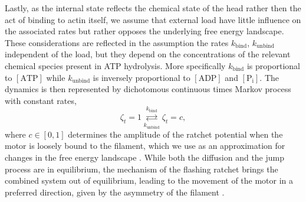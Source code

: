 \documentclass[aps,pre,twocolumn,showpacs,showkeys,superscriptaddress,floatfix]{revtex4-1}
\begin{document}
Lastly, as the internal state reflects the chemical state of the head rather then the act of binding to actin itself,
we assume that external load have little influence on the associated rates but rather opposes the underlying free energy landscape. 
These considerations are reflected in the assumption the rates $k_\text{bind}$, $k_\text{unbind}$ independent of the load, 
but they depend on the concentrations of the relevant chemical species present in ATP hydrolysis. 
More specifically $k_\text{bind}$ is proportional to $[\text{ATP}]$ while $k_\text{unbind}$ is inversely proportional to $[\text{ADP}]$ and $[\text{P}_\text{i}]$.
The dynamics is then represented by dichotomous continuous times Markov process with constant rates,
\begin{equation}
\zeta_t = 1 \overset{k_\text{bind}}{\underset{k_\text{unbind}}{\rightleftarrows}} \zeta_t = c ,
\label{eq:transition}
\end{equation}
where $c\in\left[0,1\right]$ determines the amplitude of the ratchet potential when the motor is loosely bound to the filament, 
which we use as an approximation for changes in the free energy landscape \cite{Nie2014,nie2014conformational}.
While both the diffusion and the jump process are in equilibrium, the mechanism of the flashing ratchet brings the combined system out of equilibrium, leading to the movement of the motor in a preferred direction, given by the asymmetry of the filament \cite{}. %
\end{document}
